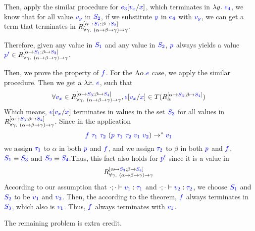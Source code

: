 \documentclass{article}
\theoremstyle{definition}
\newcommand{\meta}[1]{{\color{blue}#1}}
\begin{document}
\begin{enumerate}[start=1,label={{\bf Problem \arabic*}.},ref=\arabic*,left=0pt..0pt,widest*=10,align=left,itemindent=*]
  Then, apply the similar procedure for $\meta{e_3}[\meta{v_x}/\meta{x}]$, which terminates in $\lambda y.\ \meta{e_4}$, we know that for all value $\meta{v_y}$ in $\meta{S_2}$, if we substitute $\meta{y}$ in $\meta{e_4}$ with $\meta{v_y}$, we can get a term that terminates in $R^{[\alpha\mapsto\meta{S_1};\beta\mapsto\meta{S_2}]}_{\forall \gamma.\ (\alpha \to \beta \to \gamma) \to \gamma}$.

  Therefore, given any value in $\meta{S_1}$ and any value in $\meta{S_2}$, $\meta{p}$ always yields a value $\meta{p^\prime} \in R^{[\alpha\mapsto\meta{S_1};\beta\mapsto\meta{S_2}]}_{\forall \gamma.\ (\alpha \to \beta \to \gamma) \to \gamma}$.

  Then, we prove the property of $\meta{f}$. For the $\Lambda \alpha. \meta{e}$ case, we apply the similar procedure. Then we get a $\lambda x.\ \meta{e}$, such that $$\forall \meta{v_x} \in R^{[\alpha\mapsto\meta{S_3};\beta\mapsto\meta{S_4}]}_{\forall \gamma.\ (\alpha \to \beta \to \gamma) \to \gamma}, \meta{e}[\meta{v_x}/\meta{x}] \in T(R^{[\alpha\mapsto\meta{S_3};\beta\mapsto\meta{S_4}]}_\alpha)$$
  Which means, $\meta{e}[\meta{v_x}/\meta{x}]$ terminates in values in the set $\meta{S_3}$ for all values in $R^{[\alpha\mapsto\meta{S_3};\beta\mapsto\meta{S_4}]}_{\forall \gamma.\ (\alpha \to \beta \to \gamma) \to \gamma}$. Since in the application $$\meta{f}\ \meta{\tau_1}\ \meta{\tau_2}\ (\meta{p}\ \meta{\tau_1}\ \meta{\tau_2}\ \meta{v_1}\ \meta{v_2}) \to^* \meta{v_1}$$
  we assign $\meta{\tau_1}$ to $\alpha$ in both $\meta{p}$ and $\meta{f}$, and we assign $\meta{\tau_2}$ to $\beta$ in both $\meta{p}$ and $\meta{f}$, $\meta{S_1} \equiv \meta{S_3}$ and $\meta{S_2}\equiv \meta{S_4}$.Thus, this fact also holds for $\meta{p^\prime}$ since it is a value in $$R^{[\alpha\mapsto\meta{S_3};\beta\mapsto\meta{S_4}]}_{\forall \gamma.\ (\alpha \to \beta \to \gamma) \to \gamma}$$
  According to our assumption that $\cdot;\cdot\vdash \meta{v_1}:\meta{\tau_1}$ and $\cdot;\cdot\vdash\meta{v_2}:\meta{\tau_2}$, we choose $\meta{S_1}$ and $\meta{S_2}$ to be $\set{\meta{v_1}}$ and $\set{\meta{v_2}}$. Then, the according to the theorem, $\meta{f}$ always terminates in $\meta{S_3}$, which also is $\set{\meta{v_1}}$. Thus, $\meta{f}$ always terminates with $\meta{v_1}$.
\end{enumerate}

\noindent{}The remaining problem is extra credit.
\end{document}
